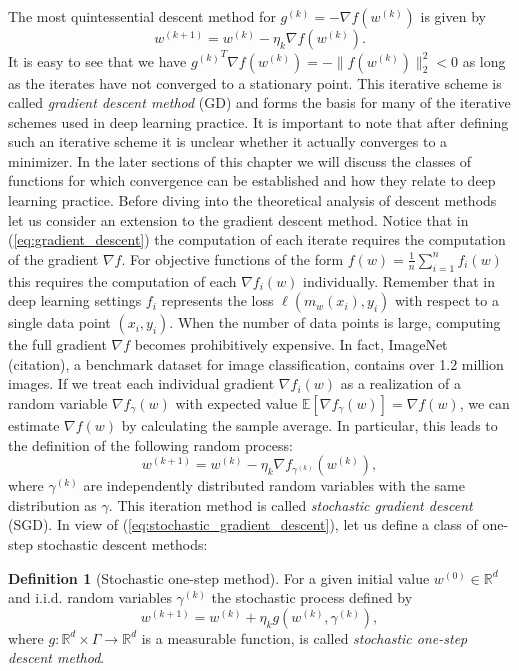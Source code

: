 \documentclass[12pt]{article}
\theoremstyle{definition}
\newtheorem{definition}[theorem]{Definition}
\numberwithin{equation}{section}
\newcommand{\ev}[1]{\mathbb{E}\left[{#1}\right]}
\newcommand{\norm}[1]{\lVert{#1}\rVert_2}
\begin{document}
The most quintessential descent method for $g^{(k)} = - \nabla f(w^{(k)})$ is given by
\begin{equation}
  \label{eq:gradient_descent}
  w^{(k+1)} = w^{(k)} - \eta_k \nabla f(w^{(k)}).
\end{equation}
It is easy to see that we have ${g^{(k)}}^T \nabla f(w^{(k)}) = -\norm{ f(w^{(k)}) }^2 < 0$ as long as the iterates have not converged to a stationary point. This iterative scheme is called \emph{gradient descent method} (GD) and forms the basis for many of the iterative schemes used in deep learning practice. It is important to note that after defining such an iterative scheme it is unclear whether it actually converges to a minimizer. In the later sections of this chapter we will discuss the classes of functions for which convergence can be established and how they relate to deep learning practice. Before diving into the theoretical analysis of descent methods let us consider an extension to the gradient descent method.
Notice that in (\ref{eq:gradient_descent}) the computation of each iterate requires the computation of the gradient $\nabla f$. For objective functions of the form $f(w) = \frac{1}{n} \sum_{i=1}^n f_i(w)$ this requires the computation of each $\nabla f_i(w)$ individually. Remember that in deep learning settings $f_i$ represents the loss $\ell(m_w(x_i), y_i)$ with respect to a single data point $(x_i, y_i)$. When the number of data points is large, computing the full gradient $\nabla f$ becomes prohibitively expensive. In fact, ImageNet (citation), a benchmark dataset for image classification, contains over 1.2 million images. If we treat each individual gradient $\nabla f_i(w)$ as a realization of a random variable $\nabla f_{\gamma}(w)$ with expected value $\ev{\nabla f_{\gamma}(w)} = \nabla f(w)$, we can estimate $\nabla f(w)$ by calculating the sample average. In particular, this leads to the definition of the following random process:
\begin{equation}
  \label{eq:stochastic_gradient_descent}
  w^{(k+1)} = w^{(k)} - \eta_k \nabla f_{\gamma^{(k)}}(w^{(k)}),
\end{equation}
where $\gamma^{(k)}$ are independently distributed random variables with the same distribution as $\gamma$. This iteration method is called \emph{stochastic gradient descent} (SGD).
In view of (\ref{eq:stochastic_gradient_descent}), let us define a class of one-step stochastic descent methods:
\begin{definition}[Stochastic one-step method]
  For a given initial value $w^{(0)} \in \mathbb{R}^d$ and i.i.d. random variables $\gamma^{(k)}$ the stochastic process defined by
\begin{equation}
  w^{(k+1)} = w^{(k)} + \eta_k g(w^{(k)}, \gamma^{(k)}),
\end{equation}
  where $g:\mathbb{R}^d \times \Gamma \rightarrow \mathbb{R}^d$ is a measurable function, is called \emph{stochastic one-step descent method}.
\end{definition}
\end{document}
